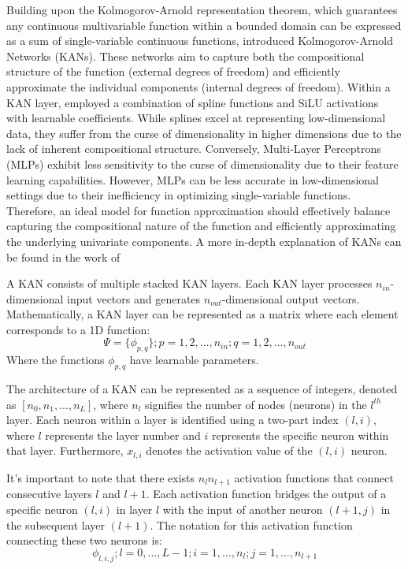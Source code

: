 \documentclass[10pt, a4paper, oneside]{article}
\begin{document}
Building upon the Kolmogorov-Arnold representation theorem, which guarantees any continuous multivariable function within a bounded domain can be expressed as a sum of single-variable continuous functions, \cite{liu2024kan} introduced Kolmogorov-Arnold Networks (KANs). These networks aim to capture both the compositional structure of the function (external degrees of freedom) and efficiently approximate the individual components (internal degrees of freedom). Within a KAN layer, \cite{liu2024kan} employed a combination of spline functions and SiLU activations with learnable coefficients. While splines excel at representing low-dimensional data, they suffer from the curse of dimensionality in higher dimensions due to the lack of inherent compositional structure. Conversely, Multi-Layer Perceptrons (MLPs) exhibit less sensitivity to the curse of dimensionality due to their feature learning capabilities. However, MLPs can be less accurate in low-dimensional settings due to their inefficiency in optimizing single-variable functions. Therefore, an ideal model for function approximation should effectively balance capturing the compositional nature of the function and efficiently approximating the underlying univariate components. A more in-depth explanation of KANs can be found in the work of \cite{liu2024kan}

A KAN consists of multiple stacked KAN layers. Each KAN layer processes $n_{in}$-dimensional input vectors and generates $n_{out}$-dimensional output vectors. Mathematically, a KAN layer can be represented as a matrix where each element corresponds to a 1D function:
\begin{equation}
    \Psi = \{\phi_{p, q}\}; p = 1, 2,\ldots, n_{in}; q = 1, 2,\ldots,n_{out} 
\end{equation}
Where the functions $\phi_{p, q}$ have learnable parameters.

The architecture of a KAN can be represented as a sequence of integers, denoted as $[n_0, n_1,..., n_L]$, where $n_l$ signifies the number of nodes (neurons) in the $l^{th}$ layer. Each neuron within a layer is identified using a two-part index $(l, i)$, where $l$ represents the layer number and $i$ represents the specific neuron within that layer. Furthermore, $x_{l, i}$ denotes the activation value of the $(l, i)$ neuron.

It's important to note that there exists $n_ln_{l+1}$ activation functions that connect consecutive layers $l$ and $l + 1$. Each activation function bridges the output of a specific neuron $(l, i)$ in layer $l$ with the input of another neuron $(l + 1, j)$ in the subsequent layer $(l + 1)$. The notation for this activation function connecting these two neurons is:
\begin{equation}
    \phi_{l, i, j}; l = 0,\ldots,L-1; i = 1,\ldots,n_l; j = 1,\ldots,n_{l+1}
\end{equation}
\end{document}
